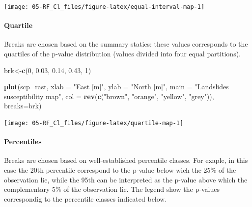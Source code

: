 \documentclass[
]{article}
\newenvironment{Shaded}{\begin{snugshade}}{\end{snugshade}}
\newcommand{\AttributeTok}[1]{\textcolor[rgb]{0.13,0.29,0.53}{#1}}
\newcommand{\DecValTok}[1]{\textcolor[rgb]{0.00,0.00,0.81}{#1}}
\newcommand{\FloatTok}[1]{\textcolor[rgb]{0.00,0.00,0.81}{#1}}
\newcommand{\FunctionTok}[1]{\textcolor[rgb]{0.13,0.29,0.53}{\textbf{#1}}}
\newcommand{\NormalTok}[1]{#1}
\newcommand{\OtherTok}[1]{\textcolor[rgb]{0.56,0.35,0.01}{#1}}
\newcommand{\StringTok}[1]{\textcolor[rgb]{0.31,0.60,0.02}{#1}}
\begin{document}
\begin{center}\texttt{[image: 05-RF\_Cl\_files/figure-latex/equal-interval-map-1]} \end{center}

\paragraph{Quartile}\label{quartile}

Breaks are chosen based on the summary statics: these values corresponds to the quartiles of the p-value distribution (values divided into four equal partitions).

\begin{Shaded}
\begin{Highlighting}[]
\NormalTok{brk}\OtherTok{\textless{}{-}}\FunctionTok{c}\NormalTok{(}\DecValTok{0}\NormalTok{, }\FloatTok{0.03}\NormalTok{, }\FloatTok{0.14}\NormalTok{, }\FloatTok{0.43}\NormalTok{, }\DecValTok{1}\NormalTok{) }

\FunctionTok{plot}\NormalTok{(scp\_rast, }\AttributeTok{xlab =} \StringTok{"East [m]"}\NormalTok{, }\AttributeTok{ylab =} \StringTok{"North [m]"}\NormalTok{, }
     \AttributeTok{main =} \StringTok{"Landslides susceptibility map"}\NormalTok{, }
     \AttributeTok{col =} \FunctionTok{rev}\NormalTok{(}\FunctionTok{c}\NormalTok{(}\StringTok{"brown"}\NormalTok{, }\StringTok{"orange"}\NormalTok{, }\StringTok{"yellow"}\NormalTok{, }\StringTok{"grey"}\NormalTok{)), }\AttributeTok{breaks=}\NormalTok{brk) }
\end{Highlighting}
\end{Shaded}

\begin{center}\texttt{[image: 05-RF\_Cl\_files/figure-latex/quartile-map-1]} \end{center}

\paragraph{Percentiles}\label{percentiles}

Breaks are chosen based on well-established percentile classes.
For exaple, in this case the 20th percentile correspond to the p-value below wich the 25\% of the observation lie, while the 95th can be interpreted as the p-value above which the complementary 5\% of the observation lie.
The legend show the p-values correspondig to the percentile classes indicated below.
\end{document}
